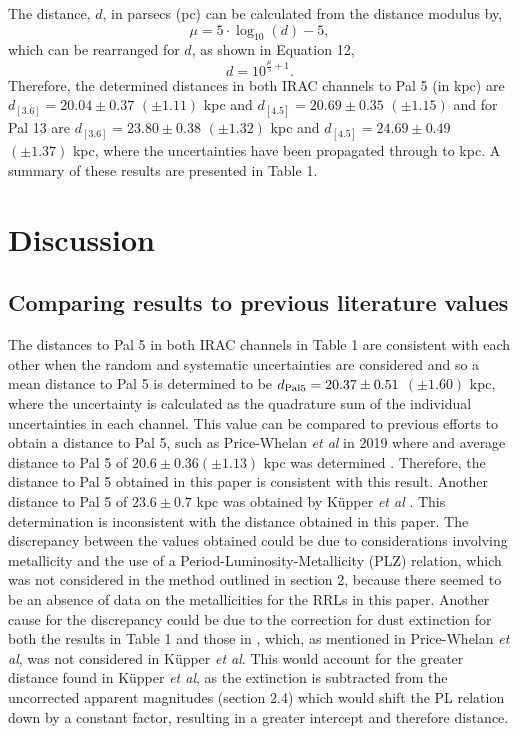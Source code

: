 \documentclass[11pt]{iopart}
\begin{document}
The distance, $d$, in parsecs (pc) can be calculated from the distance modulus by,
\begin{equation}
    \mu = 5\cdot\log_{10}(d) - 5,
\end{equation}
which can be rearranged for $d$, as shown in Equation 12,
\begin{equation}
    d = 10^{\frac{\mu}{5} + 1}.
\end{equation}
Therefore, the determined distances in both IRAC channels to Pal 5 (in kpc) are $d_{[3.6]} = 20.04\pm0.37$ $(\pm1.11)$ kpc and $d_{[4.5]} = 20.69\pm0.35$ $(\pm1.15)$ and for Pal 13 are $d_{[3.6]} = 23.80\pm0.38$ $(\pm1.32)$ kpc and $d_{[4.5]} = 24.69\pm0.49$ $(\pm1.37)$ kpc, where the uncertainties have been propagated through to kpc. A summary of these results are presented in Table 1.

\section{Discussion}
\subsection{Comparing results to previous literature values}
The distances to Pal 5 in both IRAC channels in Table 1 are consistent with each other when the random and systematic uncertainties are considered and so a mean distance to Pal 5 is determined to be $d_{\rm Pal 5} = 20.37\pm0.51$ $(\pm1.60)$ kpc, where the uncertainty is calculated as the quadrature sum of the individual uncertainties in each channel. This value can be compared to previous efforts to obtain a distance to Pal 5, such as Price-Whelan \textit{et al} in 2019 where and average distance to Pal 5 of $20.6\pm0.36 (\pm1.13)$ kpc was determined \cite{price2019}. Therefore, the distance to Pal 5 obtained in this paper is consistent with this result. Another distance to Pal 5 of $23.6\pm0.7$ kpc was obtained by Küpper \textit{et al} \cite{kupper2015}. This determination is inconsistent with the distance obtained in this paper. The discrepancy between the values obtained could be due to considerations involving metallicity and the use of a Period-Luminosity-Metallicity (PLZ) relation, which was not considered in the method outlined in section 2, because there seemed to be an absence of data on the metallicities for the RRLs in this paper. Another cause for the discrepancy could be due to the correction for dust extinction for both the results in Table 1 and those in \cite{price2019}, which, as mentioned in Price-Whelan \textit{et al}, was not considered in Küpper \textit{et al}. This would account for the greater distance found in Küpper \textit{et al}, as the extinction is subtracted from the uncorrected apparent magnitudes (section 2.4) which would shift the PL relation down by a constant factor, resulting in a greater intercept and therefore distance.
\end{document}
